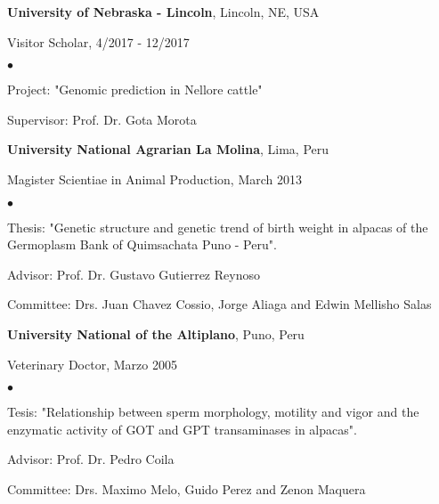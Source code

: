 \documentclass[margin,line,10pt]{res}
\newenvironment{list1}{
  \begin{list}{\ding{113}}{%
      \setlength{\itemsep}{0in}
      \setlength{\parsep}{0in} \setlength{\parskip}{0in}
      \setlength{\topsep}{0in} \setlength{\partopsep}{0in} 
      \setlength{\leftmargin}{0.17in}}}{\end{list}}
\newenvironment{list2}{
  \begin{list}{$\bullet$}{%
      \setlength{\itemsep}{0in}
      \setlength{\parsep}{0in} \setlength{\parskip}{0in}
      \setlength{\topsep}{0in} \setlength{\partopsep}{0in} 
      \setlength{\leftmargin}{0.2in}}}{\end{list}}
\begin{document}
\begin{resume}
{\bf University of Nebraska - Lincoln}, Lincoln, NE, USA\\
\vspace*{-.1in}
\begin{list1}
\item[] Visitor Scholar, 4/2017 - 12/2017
\begin{list2}
\vspace*{.05in}
\item Project: "Genomic prediction in Nellore cattle" 
\item Supervisor: Prof. Dr. Gota Morota
\end{list2}
\vspace*{.05in}
\end{list1}

{\bf University National Agrarian La Molina}, Lima, Peru\\
\vspace*{-.1in}
\begin{list1}
\item[] Magister Scientiae in Animal Production, March 2013
\begin{list2}
\vspace*{.05in}
\item Thesis: "Genetic structure and genetic trend of birth weight in alpacas of the Germoplasm Bank of Quimsachata Puno - Peru". 
\item Advisor: Prof. Dr. Gustavo Gutierrez Reynoso 
\item Committee: Drs. Juan Chavez Cossio, Jorge Aliaga and Edwin Mellisho Salas
\end{list2}
\vspace*{.05in}
\end{list1}

{\bf University National of the Altiplano}, Puno, Peru\\
\vspace*{-.1in}
\begin{list1}
\item[] Veterinary Doctor,  Marzo 2005
\begin{list2}
\vspace*{.05in}
\item Tesis: "Relationship between sperm morphology, motility and vigor and the enzymatic activity of GOT and GPT transaminases in alpacas". 
\item Advisor: Prof. Dr. Pedro Coila 
\item Committee: Drs. Maximo Melo, Guido Perez and Zenon Maquera
\end{list2}
\end{list1}


\end{resume}
\end{document}
